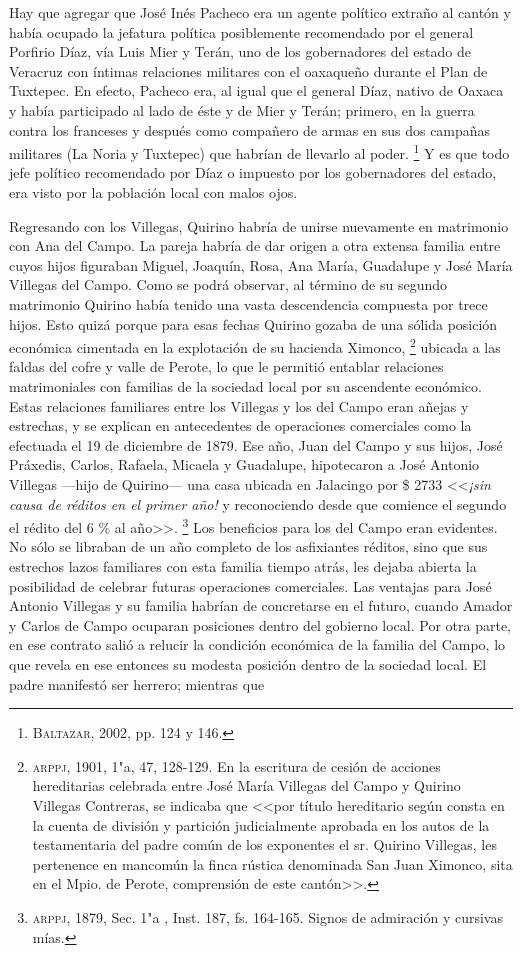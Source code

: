 \documentclass[14pt,twoside,final]{extbook} %
\let\oldfootnote\footnote
\renewcommand\footnote[1]{%
\oldfootnote{\hspace{1mm}#1}}
\begin{document}
Hay que agregar que José Inés Pacheco era un agente político extraño al cantón y había ocupado la jefatura política posiblemente recomendado por el general Porfirio Díaz, vía Luis Mier y Terán, uno de los gobernadores del estado de Veracruz con íntimas relaciones militares con el oaxaqueño durante el Plan de Tuxtepec. En efecto, Pacheco era, al igual que el general Díaz, nativo de Oaxaca y había participado al lado de éste y de Mier y Terán; primero, en la guerra contra los franceses y después como compañero de armas en sus dos campañas militares (La Noria y Tuxtepec) que habrían de llevarlo al poder.\footnote{\textsc{Baltazar}, 2002, pp. 124 y 146.} Y es que todo jefe político recomendado por Díaz o impuesto por los gobernadores del estado, era visto por la población local con malos ojos.

Regresando con los Villegas, Quirino habría de unirse nuevamente en matrimonio con Ana del Campo. La pareja habría de dar origen a otra extensa familia entre cuyos hijos figuraban Miguel, Joaquín, Rosa, Ana María, Guadalupe y José María Villegas del Campo. Como se podrá observar, al término de su segundo matrimonio Quirino había tenido una vasta descendencia compuesta por trece hijos. Esto quizá porque para esas fechas Quirino gozaba de una sólida posición económica cimentada en la explotación de su hacienda Ximonco,\footnote{\textsc{arppj}, 1901, 1"a, 47, 128-129. En la escritura de cesión de acciones hereditarias celebrada entre José María Villegas del Campo y Quirino Villegas Contreras, se indicaba que <<por título hereditario según consta en la cuenta de división y partición judicialmente aprobada en los autos de la testamentaria del padre común de los exponentes el sr. Quirino Villegas, les pertenence en mancomún la finca rústica denominada San Juan Ximonco, sita en el Mpio. de Perote, comprensión de este cantón>>.} ubicada a las faldas del cofre y valle de Perote, lo que le permitió entablar relaciones matrimoniales con familias de la sociedad local por su ascendente económico. Estas relaciones familiares entre los Villegas y los del Campo eran añejas y estrechas, y se explican en antecedentes de operaciones comerciales como la efectuada el 19 de diciembre de 1879. Ese año, Juan del Campo y sus hijos, José Práxedis, Carlos, Rafaela, Micaela y Guadalupe, hipotecaron a José Antonio Villegas ---hijo de Quirino--- una casa ubicada en Jalacingo por \$ 2733 <<\emph{¡sin causa de réditos en el primer año!} y reconociendo desde que comience el segundo el rédito del 6 \% al año>>.\footnote{\textsc{arppj}, 1879, Sec. 1"a , Inst. 187, fs. 164-165. Signos de admiración y cursivas mías.} Los beneficios para los del Campo eran evidentes. No sólo se libraban de un año completo de los asfixiantes réditos, sino que sus estrechos lazos familiares con esta familia tiempo atrás, les dejaba abierta la posibilidad de celebrar futuras operaciones comerciales. Las ventajas para José Antonio Villegas y su familia habrían de concretarse en el futuro, cuando Amador y Carlos de Campo ocuparan posiciones dentro del gobierno local. Por otra parte, en ese contrato salió a relucir la condición económica de la familia del Campo, lo que revela en ese entonces su modesta posición dentro de la sociedad local. El padre manifestó ser herrero; mientras que 
\end{document}
